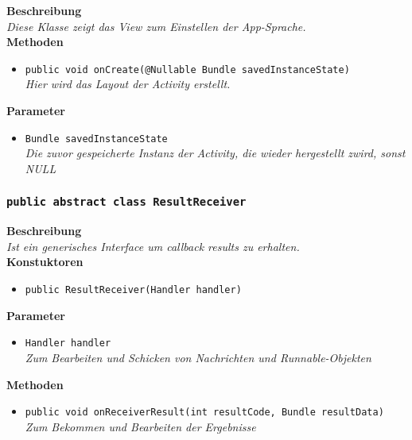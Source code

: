 	\textbf{Beschreibung} \\
	\textit{Diese Klasse zeigt das View zum Einstellen der App-Sprache.} \\

	\textbf{Methoden}
	\begin{itemize}
		\item\texttt{{public void onCreate(@Nullable Bundle savedInstanceState)}}\\
	\textit{Hier wird das Layout der Activity erstellt.}\\
	\end{itemize}

	\textbf{Parameter}
	\begin{itemize}
		\item\texttt{Bundle savedInstanceState}\\  
	\textit{Die zuvor gespeicherte Instanz der Activity, die wieder hergestellt zwird, sonst NULL}\\
	\end{itemize} 

\subsubsection{\texttt{public abstract class ResultReceiver}}

	\textbf{Beschreibung} \\
	\textit{Ist ein generisches Interface um callback results zu erhalten.} \\

	\textbf{Konstuktoren}
	\begin{itemize}
		\item\texttt{{public ResultReceiver(Handler handler)}}\\
	\end{itemize}

	\textbf{Parameter}
	\begin{itemize}
		\item\texttt{Handler handler}\\ 
	\textit{Zum Bearbeiten und Schicken von Nachrichten und Runnable-Objekten}\\
	\end{itemize}

	\textbf{Methoden}
	\begin{itemize}
		\item\texttt{{public void onReceiverResult(int resultCode, Bundle resultData)}}\\
	\textit{Zum Bekommen und Bearbeiten der Ergebnisse}\\
	\end{itemize}

